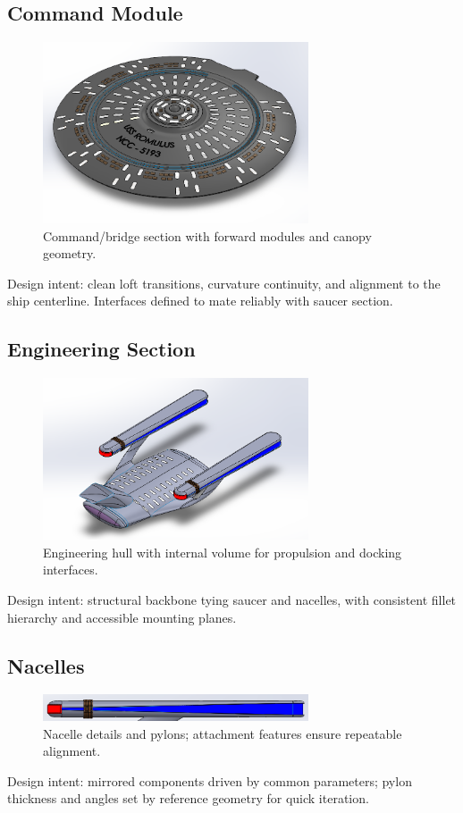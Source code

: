 \documentclass[12pt]{article}
\begin{document}
\subsection*{Command Module}
\begin{figure}[H]
    \centering
    \includegraphics[width=0.7\textwidth]{command.png}
    \caption{Command/bridge section with forward modules and canopy geometry.}
\end{figure}
Design intent: clean loft transitions, curvature continuity, and alignment to the ship
centerline. Interfaces defined to mate reliably with saucer section.

\subsection*{Engineering Section}
\begin{figure}[H]
    \centering
    \includegraphics[width=0.7\textwidth]{engineering.png}
    \caption{Engineering hull with internal volume for propulsion and docking interfaces.}
\end{figure}
Design intent: structural backbone tying saucer and nacelles, with consistent fillet
hierarchy and accessible mounting planes.

\subsection*{Nacelles}
\begin{figure}[H]
    \centering
    \includegraphics[width=0.7\textwidth]{nacelles.png}
    \caption{Nacelle details and pylons; attachment features ensure repeatable alignment.}
\end{figure}
Design intent: mirrored components driven by common parameters; pylon thickness and
angles set by reference geometry for quick iteration.
\end{document}
